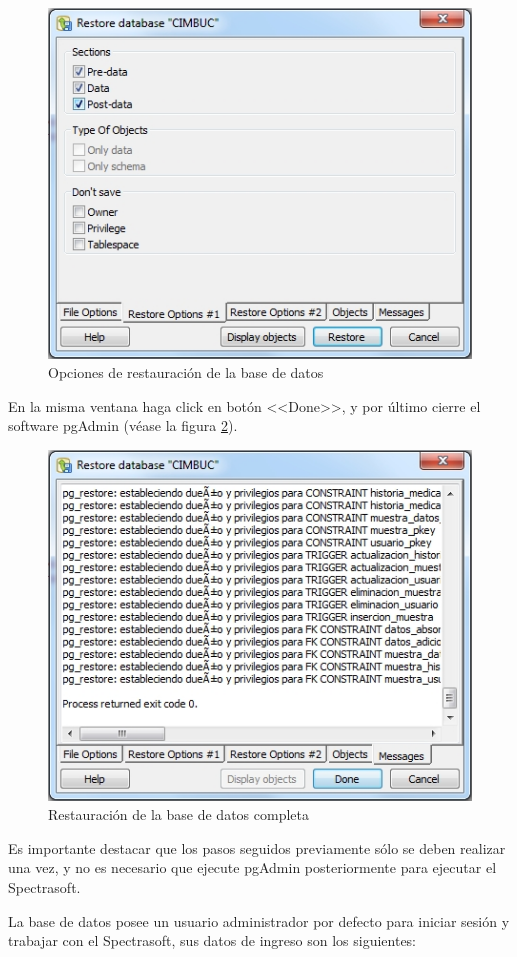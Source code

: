 \begin{figure}[H]
  \centering
  \includegraphics[width=.6\linewidth]{./img/pgadmin-restaurar-opciones.jpg}
\caption[Opciones de restauraci\'{o}n de la base de datos]{Opciones de restauraci\'{o}n de la base de datos\label{fig:pgadmin-restaurar-opciones}}
\end{figure}

\newpage

En la misma ventana haga click en bot\'{o}n <<Done>>, y por \'{u}ltimo cierre el software pgAdmin (v\'{e}ase la figura \ref{fig:pgadmin-restaurar-listo}).

\begin{figure}[H]
  \centering
  \includegraphics[width=.6\linewidth]{./img/pgadmin-restaurar-listo.jpg}
\caption[Restauraci\'{o}n de la base de datos completa]{Restauraci\'{o}n de la base de datos completa\label{fig:pgadmin-restaurar-listo}}
\end{figure}

Es importante destacar que los pasos seguidos previamente s\'{o}lo se deben realizar una vez, y no es necesario que ejecute pgAdmin posteriormente para ejecutar el Spectrasoft.

La base de datos posee un usuario administrador por defecto para iniciar sesi\'{o}n y trabajar con el Spectrasoft, sus datos de ingreso son los siguientes: 

